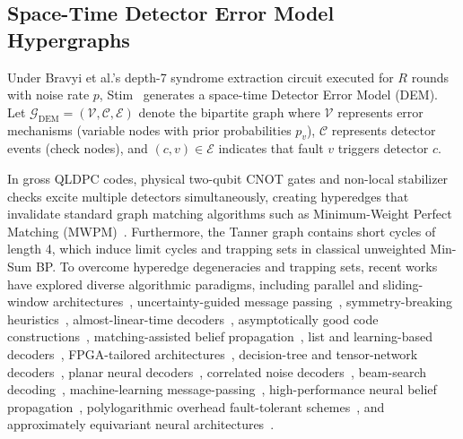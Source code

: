 \documentclass[journal]{IEEEtran}
\begin{document}
\subsection{Space-Time Detector Error Model Hypergraphs}
Under Bravyi et al.'s depth-7 syndrome extraction circuit executed for $R$ rounds with noise rate $p$, Stim~\cite{gidney2021stim} generates a space-time Detector Error Model (DEM). Let $\mathcal{G}_{\text{DEM}} = (\mathcal{V}, \mathcal{C}, \mathcal{E})$ denote the bipartite graph where $\mathcal{V}$ represents error mechanisms (variable nodes with prior probabilities $p_v$), $\mathcal{C}$ represents detector events (check nodes), and $(c, v) \in \mathcal{E}$ indicates that fault $v$ triggers detector $c$.

In gross QLDPC codes, physical two-qubit CNOT gates and non-local stabilizer checks excite multiple detectors simultaneously, creating hyperedges that invalidate standard graph matching algorithms such as Minimum-Weight Perfect Matching (MWPM)~\cite{dennis2002topological,higgott2023pymatching}. Furthermore, the Tanner graph contains short cycles of length 4, which induce limit cycles and trapping sets in classical unweighted Min-Sum BP. To overcome hyperedge degeneracies and trapping sets, recent works have explored diverse algorithmic paradigms, including parallel and sliding-window architectures~\cite{skoric2022parallel,tan2022scalable}, uncertainty-guided message passing~\cite{mi2025uncertainty}, symmetry-breaking heuristics~\cite{yin2024symbreak}, almost-linear-time decoders~\cite{demarti2024almost}, asymptotically good code constructions~\cite{panteleev2023asymptotically}, matching-assisted belief propagation~\cite{sahay2026matching}, list and learning-based decoders~\cite{moradi2024learning,moradi2024list}, FPGA-tailored architectures~\cite{tan2024fpga}, decision-tree and tensor-network decoders~\cite{ott2025decision,beni2025tesseract}, planar neural decoders~\cite{liang2025planar}, correlated noise decoders~\cite{liu2025decoding}, beam-search decoding~\cite{ye2025beam}, machine-learning message-passing~\cite{blue2025machine}, high-performance neural belief propagation~\cite{li2024high}, polylogarithmic overhead fault-tolerant schemes~\cite{yamasaki2024polylog}, and approximately equivariant neural architectures~\cite{wang2022approximately}.
\end{document}

